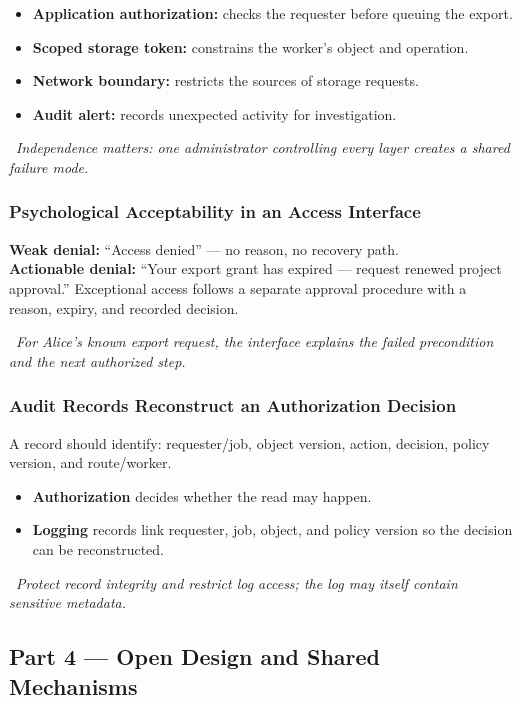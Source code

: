 \documentclass[hidelinks]{article}
\newcommand{\callout}[1]{\par\smallskip\noindent{\color{capri}$\blacktriangleright$}\ \textit{#1}\par\smallskip}
\begin{document}
\begin{itemize}
    \item \textbf{Application authorization:} checks the requester before queuing the export.
    \item \textbf{Scoped storage token:} constrains the worker's object and operation.
    \item \textbf{Network boundary:} restricts the sources of storage requests.
    \item \textbf{Audit alert:} records unexpected activity for investigation.
\end{itemize}

\callout{Independence matters: one administrator controlling every layer creates a shared failure mode.}

\subsubsection{Psychological Acceptability in an Access Interface}

\textbf{Weak denial:} ``Access denied'' --- no reason, no recovery path.\\[2pt]
\textbf{Actionable denial:} ``Your export grant has expired --- request renewed project approval.'' Exceptional access follows a separate approval procedure with a reason, expiry, and recorded decision.

\callout{For Alice's known export request, the interface explains the failed precondition and the next authorized step.}

\subsubsection{Audit Records Reconstruct an Authorization Decision}

A record should identify: requester/job, object version, action, decision, policy version, and route/worker.
\begin{itemize}
    \item \textbf{Authorization} decides whether the read may happen.
    \item \textbf{Logging} records link requester, job, object, and policy version so the decision can be reconstructed.
\end{itemize}

\callout{Protect record integrity and restrict log access; the log may itself contain sensitive metadata.}

\subsection{Part 4 --- Open Design and Shared Mechanisms}
\end{document}
